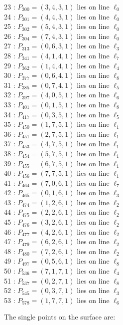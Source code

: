 \documentclass{article}
\begin{document}
{\begin{multicols}{2}
23 : $P_{300}=( 3, 4, 3, 1 )$ lies on line $\ell_{0}$\\
24 : $P_{301}=( 4, 4, 3, 1 )$ lies on line $\ell_{0}$\\
25 : $P_{302}=( 5, 4, 3, 1 )$ lies on line $\ell_{0}$\\
26 : $P_{304}=( 7, 4, 3, 1 )$ lies on line $\ell_{0}$\\
27 : $P_{313}=( 0, 6, 3, 1 )$ lies on line $\ell_{3}$\\
28 : $P_{341}=( 4, 1, 4, 1 )$ lies on line $\ell_{7}$\\
29 : $P_{362}=( 1, 4, 4, 1 )$ lies on line $\ell_{4}$\\
30 : $P_{377}=( 0, 6, 4, 1 )$ lies on line $\ell_{8}$\\
31 : $P_{385}=( 0, 7, 4, 1 )$ lies on line $\ell_{5}$\\
32 : $P_{397}=( 4, 0, 5, 1 )$ lies on line $\ell_{6}$\\
33 : $P_{401}=( 0, 1, 5, 1 )$ lies on line $\ell_{8}$\\
34 : $P_{417}=( 0, 3, 5, 1 )$ lies on line $\ell_{5}$\\
35 : $P_{450}=( 1, 7, 5, 1 )$ lies on line $\ell_{1}$\\
36 : $P_{451}=( 2, 7, 5, 1 )$ lies on line $\ell_{1}$\\
37 : $P_{453}=( 4, 7, 5, 1 )$ lies on line $\ell_{1}$\\
38 : $P_{454}=( 5, 7, 5, 1 )$ lies on line $\ell_{1}$\\
39 : $P_{455}=( 6, 7, 5, 1 )$ lies on line $\ell_{1}$\\
40 : $P_{456}=( 7, 7, 5, 1 )$ lies on line $\ell_{1}$\\
41 : $P_{464}=( 7, 0, 6, 1 )$ lies on line $\ell_{7}$\\
42 : $P_{465}=( 0, 1, 6, 1 )$ lies on line $\ell_{3}$\\
43 : $P_{474}=( 1, 2, 6, 1 )$ lies on line $\ell_{2}$\\
44 : $P_{475}=( 2, 2, 6, 1 )$ lies on line $\ell_{2}$\\
45 : $P_{476}=( 3, 2, 6, 1 )$ lies on line $\ell_{2}$\\
46 : $P_{477}=( 4, 2, 6, 1 )$ lies on line $\ell_{2}$\\
47 : $P_{479}=( 6, 2, 6, 1 )$ lies on line $\ell_{2}$\\
48 : $P_{480}=( 7, 2, 6, 1 )$ lies on line $\ell_{2}$\\
49 : $P_{497}=( 0, 5, 6, 1 )$ lies on line $\ell_{8}$\\
50 : $P_{536}=( 7, 1, 7, 1 )$ lies on line $\ell_{4}$\\
51 : $P_{537}=( 0, 2, 7, 1 )$ lies on line $\ell_{8}$\\
52 : $P_{545}=( 0, 3, 7, 1 )$ lies on line $\ell_{3}$\\
53 : $P_{578}=( 1, 7, 7, 1 )$ lies on line $\ell_{6}$\\
\end{multicols}
The single points on the surface are:\\
}
\end{document}
